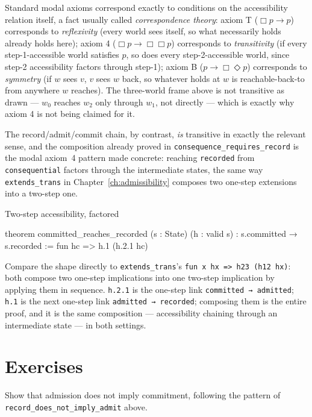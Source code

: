 Standard modal axioms correspond exactly to conditions on the
accessibility relation itself, a fact usually called
\emph{correspondence theory}: axiom T ($\Box p \to p$) corresponds
to \emph{reflexivity} (every world sees itself, so what necessarily
holds already holds here); axiom 4 ($\Box p \to \Box\Box p$)
corresponds to \emph{transitivity} (if every step-1-accessible world
satisfies $p$, so does every step-2-accessible world, since step-2
accessibility factors through step-1); axiom B ($p \to \Box\Diamond p$)
corresponds to \emph{symmetry} (if $w$ sees $v$, $v$ sees $w$ back,
so whatever holds at $w$ is reachable-back-to from anywhere $w$
reaches). The three-world frame above is not transitive as drawn —
$w_0$ reaches $w_2$ only through $w_1$, not directly — which is
exactly why axiom 4 is not being claimed for it.

The record/admit/commit chain, by contrast, \emph{is} transitive in
exactly the relevant sense, and the composition already proved in
\texttt{consequence\_requires\_record} is the modal axiom~4 pattern
made concrete: reaching \texttt{recorded} from \texttt{consequential}
factors through the intermediate states, the same way
\texttt{extends\_trans} in Chapter~\ref{ch:admissibility} composes
two one-step extensions into a two-step one.

\begin{experiment}{Two-step accessibility, factored}
\begin{lean}
theorem committed_reaches_recorded (s : State) (h : valid s) :
    s.committed → s.recorded :=
  fun hc => h.1 (h.2.1 hc)
\end{lean}
Compare the shape directly to \texttt{extends\_trans}'s
\texttt{fun x hx => h23 (h12 hx)}: both compose two one-step
implications into one two-step implication by applying them in
sequence. \texttt{h.2.1} is the one-step link
\texttt{committed → admitted}; \texttt{h.1} is the next one-step
link \texttt{admitted → recorded}; composing them is the entire
proof, and it is the same composition — accessibility chaining
through an intermediate state — in both settings.
\end{experiment}

\section{Exercises}

\begin{exercise}
Show that admission does not imply commitment, following the pattern
of \texttt{record\_does\_not\_imply\_admit} above.
\end{exercise}
